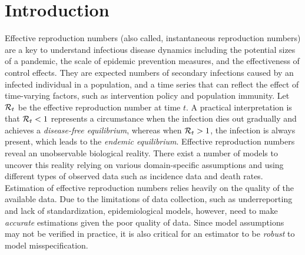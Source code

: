 \section{Introduction}
\label{sec:intro}

Effective reproduction numbers (also called, instantaneous reproduction numbers) are a key to understand infectious disease dynamics including the potential sizes of a pandemic, the scale of epidemic prevention measures, and the effectiveness of control effects. 
They are expected numbers of secondary infections caused by an infected individual in a population, and a time series that can reflect the effect of time-varying factors, such as intervention policy and population immunity. 
Let $\mathcal{R}_t$ be the effective reproduction number at time $t$. A practical interpretation is that $\mathcal{R}_t < 1$ represents a circumstance when the infection dies out gradually and achieves a \textit{disease-free equilibrium}, whereas when $\mathcal{R}_t > 1$, the infection is always present, which leads to the \textit{endemic equilibrium}. 
%
Effective reproduction numbers reveal an unobservable biological reality. 
There exist a number of models to uncover this reality relying on various domain-specific assumptions and using different types of observed data such as incidence data and death rates. 
Estimation of effective reproduction numbers relies heavily on the quality of the available data. Due to the limitations of data collection, such as underreporting and lack of standardization, epidemiological models, however, need to make \textit{accurate} estimations given the poor quality of data. Since model assumptions may not be verified in practice, it is also critical for an estimator to be \textit{robust} to model misspecification. 

